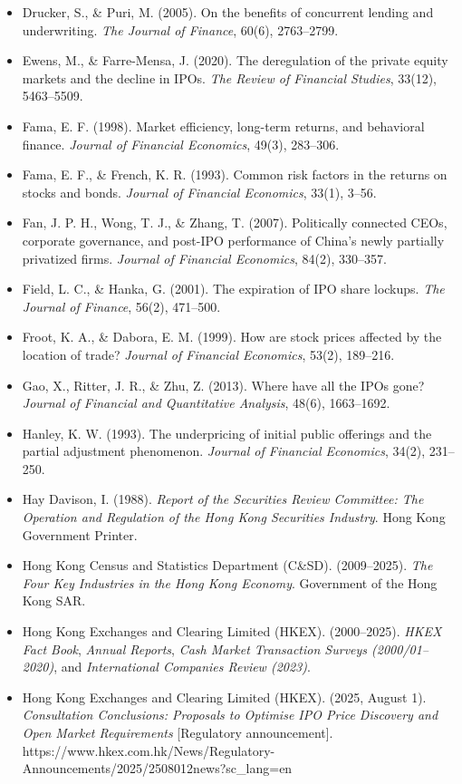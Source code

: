 \documentclass[11pt,letterpaper]{article}
\begin{document}
\begin{itemize}
\item Drucker, S., \& Puri, M. (2005). On the benefits of concurrent lending and underwriting. \textit{The Journal of Finance}, 60(6), 2763–2799.
\item Ewens, M., \& Farre-Mensa, J. (2020). The deregulation of the private equity markets and the decline in IPOs. \textit{The Review of Financial Studies}, 33(12), 5463–5509.
\item Fama, E. F. (1998). Market efficiency, long-term returns, and behavioral finance. \textit{Journal of Financial Economics}, 49(3), 283–306.
\item Fama, E. F., \& French, K. R. (1993). Common risk factors in the returns on stocks and bonds. \textit{Journal of Financial Economics}, 33(1), 3–56.
\item Fan, J. P. H., Wong, T. J., \& Zhang, T. (2007). Politically connected CEOs, corporate governance, and post-IPO performance of China's newly partially privatized firms. \textit{Journal of Financial Economics}, 84(2), 330–357.
\item Field, L. C., \& Hanka, G. (2001). The expiration of IPO share lockups. \textit{The Journal of Finance}, 56(2), 471–500.
\item Froot, K. A., \& Dabora, E. M. (1999). How are stock prices affected by the location of trade? \textit{Journal of Financial Economics}, 53(2), 189–216.
\item Gao, X., Ritter, J. R., \& Zhu, Z. (2013). Where have all the IPOs gone? \textit{Journal of Financial and Quantitative Analysis}, 48(6), 1663–1692.
\item Hanley, K. W. (1993). The underpricing of initial public offerings and the partial adjustment phenomenon. \textit{Journal of Financial Economics}, 34(2), 231–250.
\item Hay Davison, I. (1988). \textit{Report of the Securities Review Committee: The Operation and Regulation of the Hong Kong Securities Industry}. Hong Kong Government Printer.
\item Hong Kong Census and Statistics Department (C\&SD). (2009–2025). \textit{The Four Key Industries in the Hong Kong Economy}. Government of the Hong Kong SAR.
\item Hong Kong Exchanges and Clearing Limited (HKEX). (2000–2025). \textit{HKEX Fact Book}, \textit{Annual Reports}, \textit{Cash Market Transaction Surveys (2000/01–2020)}, and \textit{International Companies Review (2023)}.
\item Hong Kong Exchanges and Clearing Limited (HKEX). (2025, August 1). \textit{Consultation Conclusions: Proposals to Optimise IPO Price Discovery and Open Market Requirements} [Regulatory announcement]. https://www.hkex.com.hk/News/Regulatory-Announcements/2025/2508012news?sc\_lang=en

\end{itemize}
\end{document}
